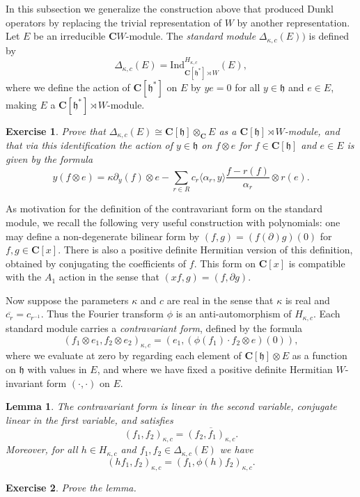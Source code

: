 \documentclass[12pt, reqno]{amsart}
\numberwithin{equation}{section}
\theoremstyle{definition}
\theoremstyle{plain}
\newtheorem{lemma}[theorem]{Lemma}
\newtheorem{exercise}{Exercise}
\newcommand{\CC}{\mathbf{C}}
\newcommand{\hh}{\mathfrak{h}}
\newcommand{\la}{\langle}
\newcommand{\ra}{\rangle}
\begin{document}
In this subsection we generalize the construction above that produced Dunkl operators by replacing the trivial representation of $W$ by another representation. Let $E$ be an irreducible $\CC W$-module. The \emph{standard module} $\Delta_{\kappa,c}(E))$ is defined by
$$\Delta_{\kappa,c}(E)=\mathrm{Ind}_{\CC[\hh^*] \rtimes W}^{H_{\kappa,c}} (E),$$ where we define the action of $\CC[\hh^*]$ on $E$ by $ye=0$ for all $y \in \hh$ and $e \in E$, making $E$ a $\CC[\hh^*] \rtimes W$-module.
\begin{exercise}
Prove that $\Delta_{\kappa,c}(E) \cong \CC[\hh] \otimes_\CC E$ as a $\CC[\hh] \rtimes W$-module, and that via this identification the action of $y \in \hh$ on $f \otimes e$ for $f \in \CC[\hh]$ and $e \in E$ is given by the formula
$$y(f \otimes e)=\kappa \partial_y(f) \otimes e-\sum_{r \in R} c_r \la \alpha_r,y \ra \frac{f-r(f)}{\alpha_r} \otimes r(e).$$ 	
\end{exercise}

As motivation for the definition of the contravariant form on the standard module, we recall the following very useful construction with polynomials: one may define a non-degenerate bilinear form by $(f,g)=(f(\partial)g)(0)$ for $f,g \in \CC[x]$. There is also a positive definite Hermitian version of this definition, obtained by conjugating the coefficients of $f$. This form on $\CC[x]$ is compatible with the $A_1$ action in the sense that $(x f,g)=(f,\partial g)$.

Now suppose the parameters $\kappa$ and $c$ are real in the sense that $\kappa$ is real and $\overline{c_r}=c_{r^{-1}}$. Thus the Fourier transform $\phi$ is an anti-automorphism of $H_{\kappa,c}$. Each standard module carries a \emph{contravariant form}, defined by the formula
$$(f_1 \otimes e_1,f_2 \otimes e_2 )_{\kappa,c}=(e_1,(\phi(f_1) \cdot f_2 \otimes e)(0)),$$ where we evaluate at zero by regarding each element of $\CC[\hh] \otimes E$ as a function on $\hh$ with values in $E$, and where we have fixed a positive definite Hermitian $W$-invariant form $(\cdot,\cdot)$ on $E$.

\begin{lemma}
The contravariant form is linear in the second variable, conjugate linear in the first variable, and satisfies
$$(f_1,f_2)_{\kappa,c}=\overline{(f_2,f_1)_{\kappa,c}}.$$ Moreover, for all $h \in H_{\kappa,c}$ and $f_1,f_2 \in \Delta_{\kappa,c}(E)$ we have
$$(h f_1,f_2)_{\kappa,c}=(f_1,\phi(h) f_2)_{\kappa,c}.$$
\end{lemma}
\begin{exercise}
Prove the lemma.	
\end{exercise}
\end{document}
